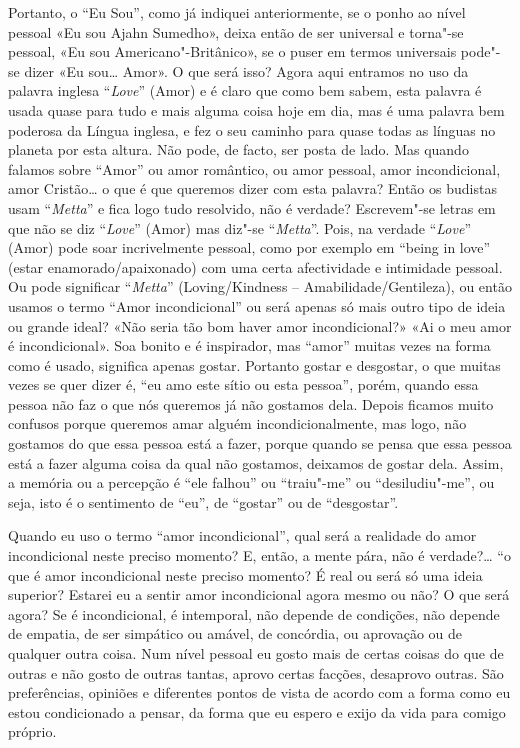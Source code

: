 Portanto, o ``Eu Sou'', como já indiquei anteriormente, se o ponho ao
nível pessoal «Eu sou Ajahn Sumedho», deixa então de ser universal e
torna"-se pessoal, «Eu sou Americano"-Britânico», se o puser em termos
universais pode"-se dizer «Eu sou\ldots{} Amor». O que será isso? Agora aqui
entramos no uso da palavra inglesa ``\emph{Love}'' (Amor) e é claro que
como bem sabem, esta palavra é usada quase para tudo e mais alguma coisa
hoje em dia, mas é uma palavra bem poderosa da Língua inglesa, e fez o
seu caminho para quase todas as línguas no planeta por esta altura. Não
pode, de facto, ser posta de lado. Mas quando falamos sobre ``Amor'' ou
amor romântico, ou amor pessoal, amor incondicional, amor Cristão\ldots{} o
que é que queremos dizer com esta palavra? Então os budistas usam
``\emph{Metta}'' e fica logo tudo resolvido, não é verdade? Escrevem"-se
letras em que não se diz ``\emph{Love}'' (Amor) mas diz"-se
``\emph{Metta}''. Pois, na verdade ``\emph{Love}'' (Amor) pode soar
incrivelmente pessoal, como por exemplo em ``being in love'' (estar
enamorado/apaixonado) com uma certa afectividade e intimidade pessoal.
Ou pode significar ``\emph{Metta}'' (Loving/Kindness --
Amabilidade/Gentileza), ou então usamos o termo ``Amor incondicional''
ou será apenas só mais outro tipo de ideia ou grande ideal? «Não seria
tão bom haver amor incondicional?» «Ai o meu amor é incondicional». Soa
bonito e é inspirador, mas ``amor'' muitas vezes na forma como é usado,
significa apenas gostar. Portanto gostar e desgostar, o que muitas vezes
se quer dizer é, ``eu amo este sítio ou esta pessoa'', porém, quando
essa pessoa não faz o que nós queremos já não gostamos dela. Depois
ficamos muito confusos porque queremos amar alguém incondicionalmente,
mas logo, não gostamos do que essa pessoa está a fazer, porque quando se
pensa que essa pessoa está a fazer alguma coisa da qual não gostamos,
deixamos de gostar dela. Assim, a memória ou a percepção é ``ele
falhou'' ou ``traiu"-me'' ou ``desiludiu"-me'', ou seja, isto é o
sentimento de ``eu'', de ``gostar'' ou de ``desgostar''.

Quando eu uso o termo ``amor incondicional'', qual será a realidade do
amor incondicional neste preciso momento? E, então, a mente pára, não é
verdade?\ldots{} ``o que é amor incondicional neste preciso momento? É real ou
será só uma ideia superior? Estarei eu a sentir amor incondicional agora
mesmo ou não? O que será agora? Se é incondicional, é intemporal, não
depende de condições, não depende de empatia, de ser simpático ou
amável, de concórdia, ou aprovação ou de qualquer outra coisa. Num nível
pessoal eu gosto mais de certas coisas do que de outras e não gosto de
outras tantas, aprovo certas facções, desaprovo outras. São
preferências, opiniões e diferentes pontos de vista de acordo com a
forma como eu estou condicionado a pensar, da forma que eu espero e
exijo da vida para comigo próprio.

